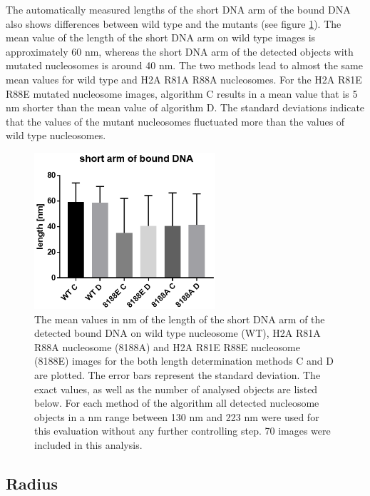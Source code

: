 \documentclass{article}
\begin{document}
The automatically measured lengths of the short DNA arm of the bound DNA also shows differences between wild type and the mutants (see figure \ref{fig: arm}). The mean value of the length of the short DNA arm on wild type images is approximately 60 nm, whereas the short DNA arm of the detected objects with mutated nucleosomes is around 40 nm. The two methods lead to almost the same mean values for wild type and H2A R81A R88A nucleosomes. For the H2A R81E R88E mutated nucleosome images, algorithm C results in a mean value that is 5 nm shorter than the mean value of algorithm D. The standard deviations indicate that the values of the mutant nucleosomes fluctuated more than the values of wild type nucleosomes.
%
\begin{figure}[!htb]
	\begin{center}
		\includegraphics[width = 0.6\textwidth]{arm}
	\end{center}
	\caption{The mean values in nm of the length of the short DNA arm of the detected bound DNA on wild type nucleosome (WT), H2A R81A R88A nucleosome (8188A) and H2A R81E R88E nucleosome (8188E) images for the both length determination methods C and D are plotted. The error bars represent the standard deviation. The exact values, as well as the number of analysed objects are listed below. For each method of the algorithm all detected nucleosome objects in a nm range between 130 nm and 223 nm were used for this evaluation without any further controlling step. 70 images were included in this analysis.}
	\label{fig: arm} %
\end{figure}

\subsection{Radius}\label{sec: Radius}
\end{document}
